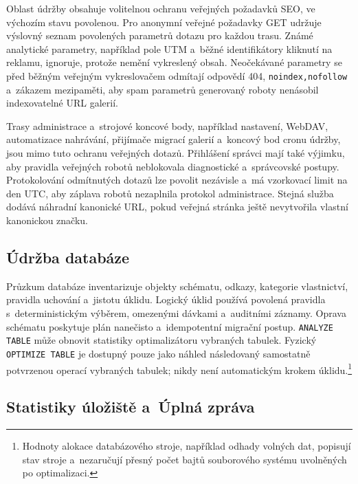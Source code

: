 \documentclass[11pt,a4paper]{article}
\newcommand{\codeword}[1]{\nolinkurl{#1}}
\begin{document}
Oblast údržby obsahuje volitelnou ochranu veřejných požadavků SEO, ve výchozím
stavu povolenou. Pro anonymní veřejné požadavky GET udržuje výslovný seznam
povolených parametrů dotazu pro každou trasu. Známé analytické parametry,
například pole UTM a~běžné identifikátory kliknutí na reklamu, ignoruje, protože
nemění vykreslený obsah. Neočekávané parametry se před běžným veřejným
vykreslovačem odmítají odpovědí 404, \codeword{noindex,nofollow} a~zákazem
mezipaměti, aby spam parametrů generovaný roboty nenásobil indexovatelné URL
galerií.

Trasy administrace a~strojové koncové body, například nastavení, WebDAV,
automatizace nahrávání, přijímače migrací galerií a~koncový bod cronu údržby,
jsou mimo tuto ochranu veřejných dotazů. Přihlášení správci mají také výjimku,
aby pravidla veřejných robotů neblokovala diagnostické a~správcovské postupy.
Protokolování odmítnutých dotazů lze povolit nezávisle a~má vzorkovací limit na
den UTC, aby záplava robotů nezaplnila protokol administrace. Stejná služba
dodává náhradní kanonické URL, pokud veřejná stránka ještě nevytvořila vlastní
kanonickou značku.

\subsection{Údržba databáze}

Průzkum databáze inventarizuje objekty schématu, odkazy, kategorie vlastnictví,
pravidla uchování a~jistotu úklidu. Logický úklid používá povolená pravidla
s~deterministickým výběrem, omezenými dávkami a~auditními záznamy. Oprava
schématu poskytuje plán nanečisto a~idempotentní migrační postup.
\codeword{ANALYZE TABLE} může obnovit statistiky optimalizátoru vybraných
tabulek. Fyzický \codeword{OPTIMIZE TABLE} je dostupný pouze jako náhled
následovaný samostatně potvrzenou operací vybraných tabulek; nikdy není
automatickým krokem úklidu.\footnote{Hodnoty alokace databázového stroje,
například odhady volných dat, popisují stav stroje a~nezaručují přesný počet
bajtů souborového systému uvolněných po optimalizaci.}

\subsection{Statistiky úložiště a~Úplná zpráva}
\end{document}
